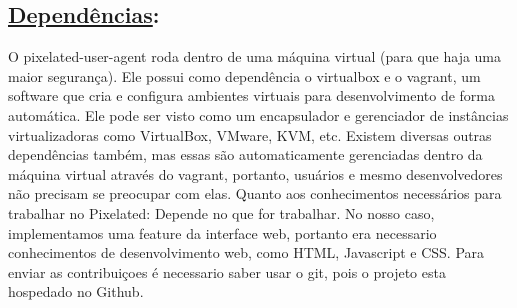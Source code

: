 \subsection*{\underline{Dependências}:}

O pixelated-user-agent roda dentro de uma máquina virtual (para que haja uma maior segurança).
    Ele possui como dependência o virtualbox e o vagrant, um software que cria e configura ambientes virtuais para desenvolvimento de forma automática. Ele pode ser visto como um encapsulador e gerenciador de instâncias virtualizadoras como VirtualBox, VMware, KVM, etc.
Existem diversas outras dependências também, mas essas são automaticamente gerenciadas dentro da máquina virtual através do vagrant, portanto, usuários e mesmo desenvolvedores não precisam se preocupar com elas.
Quanto aos conhecimentos necessários para trabalhar no Pixelated:
Depende no que for trabalhar. No nosso caso, implementamos uma feature da interface web, portanto era necessario conhecimentos de desenvolvimento web, como HTML, Javascript e CSS.
Para enviar as contribuiçoes é necessario saber usar o git, pois o projeto esta hospedado no Github.

